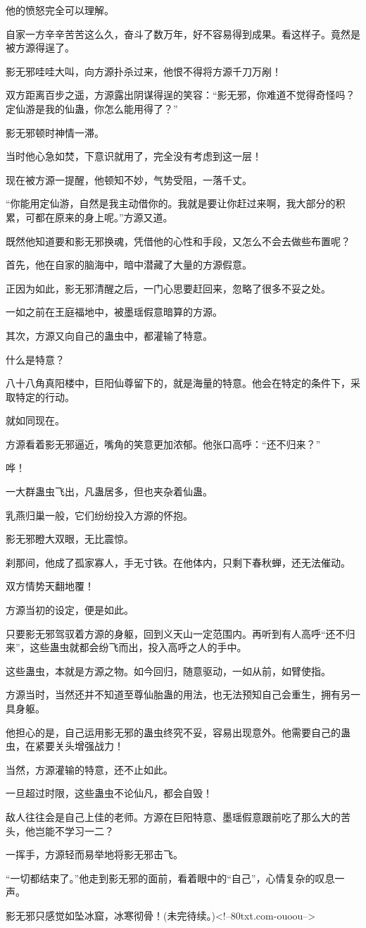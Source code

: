 \begin{this_body}
他的愤怒完全可以理解。

自家一方辛辛苦苦这么久，奋斗了数万年，好不容易得到成果。看这样子。竟然是被方源得逞了。

影无邪哇哇大叫，向方源扑杀过来，他恨不得将方源千刀万剐！

双方距离百步之遥，方源露出阴谋得逞的笑容：“影无邪，你难道不觉得奇怪吗？定仙游是我的仙蛊，你怎么能用得了？”

影无邪顿时神情一滞。

当时他心急如焚，下意识就用了，完全没有考虑到这一层！

现在被方源一提醒，他顿知不妙，气势受阻，一落千丈。

“你能用定仙游，自然是我主动借你的。我就是要让你赶过来啊，我大部分的积累，可都在原来的身上呢。”方源又道。

既然他知道要和影无邪换魂，凭借他的心性和手段，又怎么不会去做些布置呢？

首先，他在自家的脑海中，暗中潜藏了大量的方源假意。

正因为如此，影无邪清醒之后，一门心思要赶回来，忽略了很多不妥之处。

一如之前在王庭福地中，被墨瑶假意暗算的方源。

其次，方源又向自己的蛊虫中，都灌输了特意。

什么是特意？

八十八角真阳楼中，巨阳仙尊留下的，就是海量的特意。他会在特定的条件下，采取特定的行动。

就如同现在。

方源看着影无邪逼近，嘴角的笑意更加浓郁。他张口高呼：“还不归来？”

哗！

一大群蛊虫飞出，凡蛊居多，但也夹杂着仙蛊。

乳燕归巢一般，它们纷纷投入方源的怀抱。

影无邪瞪大双眼，无比震惊。

刹那间，他成了孤家寡人，手无寸铁。在他体内，只剩下春秋蝉，还无法催动。

双方情势天翻地覆！

方源当初的设定，便是如此。

只要影无邪驾驭着方源的身躯，回到义天山一定范围内。再听到有人高呼“还不归来”，这些蛊虫就都会纷飞而出，投入高呼之人的手中。

这些蛊虫，本就是方源之物。如今回归，随意驱动，一如从前，如臂使指。

方源当时，当然还并不知道至尊仙胎蛊的用法，也无法预知自己会重生，拥有另一具身躯。

他担心的是，自己运用影无邪的蛊虫终究不妥，容易出现意外。他需要自己的蛊虫，在紧要关头增强战力！

当然，方源灌输的特意，还不止如此。

一旦超过时限，这些蛊虫不论仙凡，都会自毁！

敌人往往会是自己上佳的老师。方源在巨阳特意、墨瑶假意跟前吃了那么大的苦头，他岂能不学习一二？

一挥手，方源轻而易举地将影无邪击飞。

“一切都结束了。”他走到影无邪的面前，看着眼中的“自己”，心情复杂的叹息一声。

影无邪只感觉如坠冰窟，冰寒彻骨！(未完待续。)<!--80txt.com-ouoou-->

\end{this_body}

